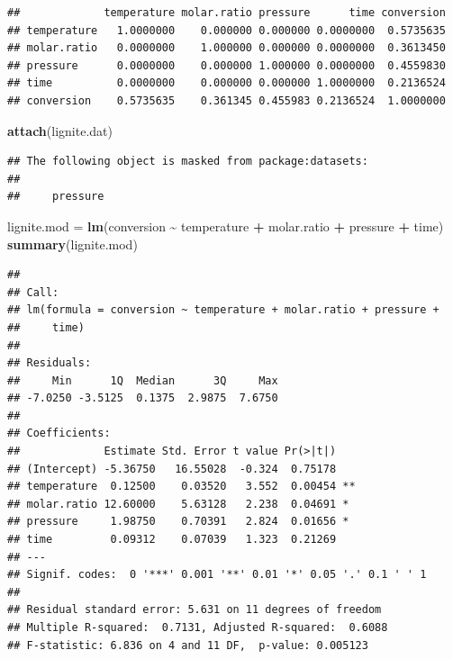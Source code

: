 \documentclass[
]{article}
\newenvironment{Shaded}{\begin{snugshade}}{\end{snugshade}}
\newcommand{\FunctionTok}[1]{\textcolor[rgb]{0.13,0.29,0.53}{\textbf{#1}}}
\newcommand{\NormalTok}[1]{#1}
\newcommand{\OtherTok}[1]{\textcolor[rgb]{0.56,0.35,0.01}{#1}}
\newcommand{\SpecialCharTok}[1]{\textcolor[rgb]{0.81,0.36,0.00}{\textbf{#1}}}
\begin{document}
\begin{verbatim}
##             temperature molar.ratio pressure      time conversion
## temperature   1.0000000    0.000000 0.000000 0.0000000  0.5735635
## molar.ratio   0.0000000    1.000000 0.000000 0.0000000  0.3613450
## pressure      0.0000000    0.000000 1.000000 0.0000000  0.4559830
## time          0.0000000    0.000000 0.000000 1.0000000  0.2136524
## conversion    0.5735635    0.361345 0.455983 0.2136524  1.0000000
\end{verbatim}

\begin{Shaded}
\begin{Highlighting}[]
\FunctionTok{attach}\NormalTok{(lignite.dat)}
\end{Highlighting}
\end{Shaded}

\begin{verbatim}
## The following object is masked from package:datasets:
## 
##     pressure
\end{verbatim}

\begin{Shaded}
\begin{Highlighting}[]
\NormalTok{lignite.mod }\OtherTok{=} \FunctionTok{lm}\NormalTok{(conversion }\SpecialCharTok{\textasciitilde{}}\NormalTok{ temperature }\SpecialCharTok{+}\NormalTok{ molar.ratio }\SpecialCharTok{+}\NormalTok{ pressure }\SpecialCharTok{+}\NormalTok{ time)}
\FunctionTok{summary}\NormalTok{(lignite.mod)}
\end{Highlighting}
\end{Shaded}

\begin{verbatim}
## 
## Call:
## lm(formula = conversion ~ temperature + molar.ratio + pressure + 
##     time)
## 
## Residuals:
##     Min      1Q  Median      3Q     Max 
## -7.0250 -3.5125  0.1375  2.9875  7.6750 
## 
## Coefficients:
##             Estimate Std. Error t value Pr(>|t|)   
## (Intercept) -5.36750   16.55028  -0.324  0.75178   
## temperature  0.12500    0.03520   3.552  0.00454 **
## molar.ratio 12.60000    5.63128   2.238  0.04691 * 
## pressure     1.98750    0.70391   2.824  0.01656 * 
## time         0.09312    0.07039   1.323  0.21269   
## ---
## Signif. codes:  0 '***' 0.001 '**' 0.01 '*' 0.05 '.' 0.1 ' ' 1
## 
## Residual standard error: 5.631 on 11 degrees of freedom
## Multiple R-squared:  0.7131, Adjusted R-squared:  0.6088 
## F-statistic: 6.836 on 4 and 11 DF,  p-value: 0.005123
\end{verbatim}
\end{document}
